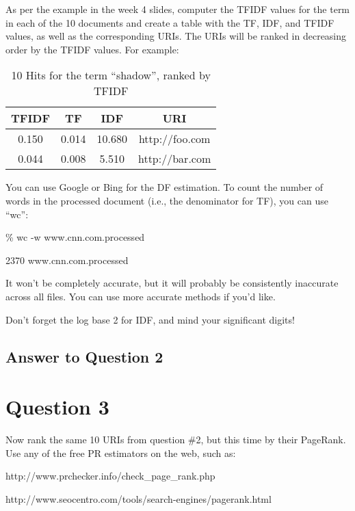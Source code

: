 \documentclass{article}
\begin{document}
As per the example in the week 4 slides, computer the TFIDF values for the term in each of the 10 documents and create a table with the TF, IDF, and TFIDF values, as well as the corresponding URIs. The URIs will be ranked in decreasing order by the TFIDF values. For example:

\begin{table}[!h]
\centering
\caption{10 Hits for the term ``shadow'', ranked by TFIDF}
\begin{tabular}{c c c c}
\hline
TFIDF & TF & IDF & URI \\
\hline
\hline
0.150 & 0.014 & 10.680 & http://foo.com \\
0.044 & 0.008 & 5.510 & http://bar.com \\
\hline
\end{tabular}
\end{table}

You can use Google or Bing for the DF estimation. To count the number of words in the processed document (i.e., the denominator for TF),  you can use ``wc'':

\% wc -w www.cnn.com.processed

2370 www.cnn.com.processed

It won't be completely accurate, but it will probably be consistently inaccurate across all files. You can use more accurate methods if you'd like.

Don't forget the log base 2 for IDF, and mind your significant digits!

\subsection*{Answer to Question 2}


\section*{Question 3}

Now rank the same 10 URIs from question \#2, but this time by their PageRank. Use any of the free PR estimators on the web, such as:

http://www.prchecker.info/check\_page\_rank.php

http://www.seocentro.com/tools/search-engines/pagerank.html
\end{document}
